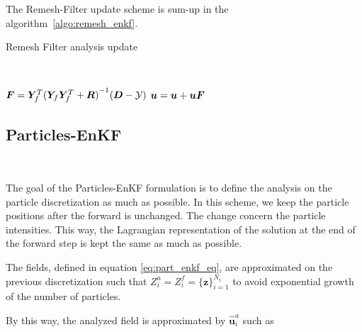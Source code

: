 The Remesh-Filter update scheme is sum-up in the algorithm~\ref{algo:remesh_enkf}.

\begin{algorithm}

    \caption{Remesh Filter analysis update}~\label{algo:remesh_enkf}

    $ \bm{F} = \bm Y_f^T {(\bm Y_f \bm Y_f^T + \bm R)}^{-1}(\bm{D} - \mathcal{Y})$ 
    $\bm u = \bm u + \bm u \bm{F}$ 
\end{algorithm}

\subsection{Particles-EnKF}~\label{part_enkf}

The goal of the Particles-EnKF formulation is to define the analysis on the particle discretization as much as possible. In this scheme, we keep the particle positions after the forward is unchanged. The change concern the particle intensities. This way, the Lagrangian representation of the solution at the end of the forward step is kept the same as much as possible.

The fields, defined in equation \eqref{eq:part_enkf_eq}, are approximated on the previous discretization such that $Z^a_i = Z_i^f = \{\bm z\}_{i=1}^{N_i}$ to avoid exponential growth of the number of particles.


By this way, the analyzed field is approximated by $\hat{\bm u}^a_i$ such as

